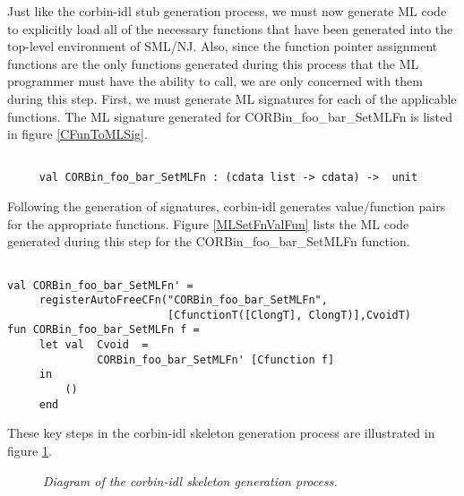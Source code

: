 Just like the corbin-idl stub generation process, we must now generate 
ML code to explicitly load all of the necessary functions that have been 
generated into the top-level environment of SML/NJ.  Also, since 
the function pointer assignment functions are the only functions generated 
during this process that the ML programmer must have the ability to call, 
we are only concerned with them during this step.  First, we must generate
ML signatures for each of the applicable functions.  The ML signature 
generated for CORBin\_foo\_bar\_SetMLFn is listed in figure \ref{CFunToMLSig}.
\begin{figure*}[t]
\singlespace
\begin{verbatim}

     val CORBin_foo_bar_SetMLFn : (cdata list -> cdata) ->  unit

\end{verbatim}
\doublespace
\caption {\em{ML signature for the CORBin\_foo\_bar\_SetMLFn function}.}
\figline
        \label{CFunToMLSig}
\end{figure*}
Following the generation of signatures, corbin-idl generates value/function 
pairs for the appropriate functions.  
\pagebreak
Figure \ref{MLSetFnValFun} lists 
the ML code generated during this step for the CORBin\_foo\_bar\_SetMLFn
function.   
\begin{figure*}[t]
\singlespace
\begin{verbatim}

val CORBin_foo_bar_SetMLFn' =
     registerAutoFreeCFn("CORBin_foo_bar_SetMLFn", 
                         [CfunctionT([ClongT], ClongT)],CvoidT)
fun CORBin_foo_bar_SetMLFn f =
     let val  Cvoid  = 
              CORBin_foo_bar_SetMLFn' [Cfunction f] 
     in  
         ()
     end

\end{verbatim}
\doublespace
\caption {\em{ML value/function pair for the CORBin\_foo\_bar\_SetMLFn function}.}
\figline
        \label{MLSetFnValFun}
\end{figure*}
These key steps in the corbin-idl skeleton generation process are illustrated 
in figure \ref{corbinIDLSkels}. 
\begin{figure}
\begin{center}
\leavevmode
\caption{\em{Diagram of the corbin-idl skeleton generation process}.}
\figline
         \label{corbinIDLSkels}
\end{center}
\end{figure}


